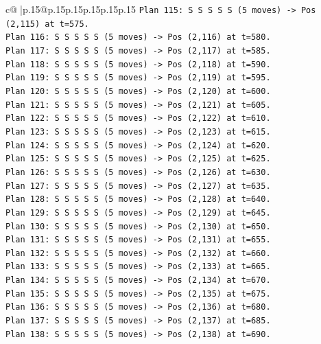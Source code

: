 \documentclass{article}
\begin{document}
{\begin{supertabular}{c@{$\;$}|p{.15\linewidth}@{}p{.15\linewidth}p{.15\linewidth}p{.15\linewidth}p{.15\linewidth}p{.15\linewidth}}
{{{\texttt{Plan 115: S S S S S (5 moves) {-}> Pos (2,115) at t=575.} \\
\texttt{Plan 116: S S S S S (5 moves) {-}> Pos (2,116) at t=580.} \\
\texttt{Plan 117: S S S S S (5 moves) {-}> Pos (2,117) at t=585.} \\
\texttt{Plan 118: S S S S S (5 moves) {-}> Pos (2,118) at t=590.} \\
\texttt{Plan 119: S S S S S (5 moves) {-}> Pos (2,119) at t=595.} \\
\texttt{Plan 120: S S S S S (5 moves) {-}> Pos (2,120) at t=600.} \\
\texttt{Plan 121: S S S S S (5 moves) {-}> Pos (2,121) at t=605.} \\
\texttt{Plan 122: S S S S S (5 moves) {-}> Pos (2,122) at t=610.} \\
\texttt{Plan 123: S S S S S (5 moves) {-}> Pos (2,123) at t=615.} \\
\texttt{Plan 124: S S S S S (5 moves) {-}> Pos (2,124) at t=620.} \\
\texttt{Plan 125: S S S S S (5 moves) {-}> Pos (2,125) at t=625.} \\
\texttt{Plan 126: S S S S S (5 moves) {-}> Pos (2,126) at t=630.} \\
\texttt{Plan 127: S S S S S (5 moves) {-}> Pos (2,127) at t=635.} \\
\texttt{Plan 128: S S S S S (5 moves) {-}> Pos (2,128) at t=640.} \\
\texttt{Plan 129: S S S S S (5 moves) {-}> Pos (2,129) at t=645.} \\
\texttt{Plan 130: S S S S S (5 moves) {-}> Pos (2,130) at t=650.} \\
\texttt{Plan 131: S S S S S (5 moves) {-}> Pos (2,131) at t=655.} \\
\texttt{Plan 132: S S S S S (5 moves) {-}> Pos (2,132) at t=660.} \\
\texttt{Plan 133: S S S S S (5 moves) {-}> Pos (2,133) at t=665.} \\
\texttt{Plan 134: S S S S S (5 moves) {-}> Pos (2,134) at t=670.} \\
\texttt{Plan 135: S S S S S (5 moves) {-}> Pos (2,135) at t=675.} \\
\texttt{Plan 136: S S S S S (5 moves) {-}> Pos (2,136) at t=680.} \\
\texttt{Plan 137: S S S S S (5 moves) {-}> Pos (2,137) at t=685.} \\
\texttt{Plan 138: S S S S S (5 moves) {-}> Pos (2,138) at t=690.} \\
}}}
\end{supertabular}}
\end{document}
